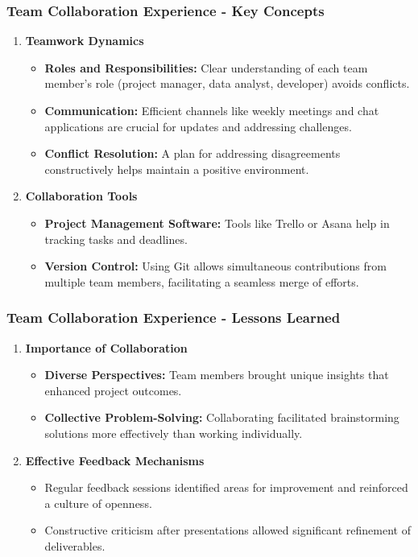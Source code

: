 \documentclass[aspectratio=169]{beamer}
\begin{document}
\begin{frame}[fragile]
    \frametitle{Team Collaboration Experience - Key Concepts}
    \begin{enumerate}
        \item \textbf{Teamwork Dynamics}
            \begin{itemize}
                \item \textbf{Roles and Responsibilities:} Clear understanding of each team member's role (project manager, data analyst, developer) avoids conflicts.
                \item \textbf{Communication:} Efficient channels like weekly meetings and chat applications are crucial for updates and addressing challenges.
                \item \textbf{Conflict Resolution:} A plan for addressing disagreements constructively helps maintain a positive environment.
            \end{itemize}
        
        \item \textbf{Collaboration Tools}
            \begin{itemize}
                \item \textbf{Project Management Software:} Tools like Trello or Asana help in tracking tasks and deadlines.
                \item \textbf{Version Control:} Using Git allows simultaneous contributions from multiple team members, facilitating a seamless merge of efforts.
            \end{itemize}
    \end{enumerate}
\end{frame}

\begin{frame}[fragile]
    \frametitle{Team Collaboration Experience - Lessons Learned}
    \begin{enumerate}
        \item \textbf{Importance of Collaboration}
            \begin{itemize}
                \item \textbf{Diverse Perspectives:} Team members brought unique insights that enhanced project outcomes.
                \item \textbf{Collective Problem-Solving:} Collaborating facilitated brainstorming solutions more effectively than working individually.
            \end{itemize}
        
        \item \textbf{Effective Feedback Mechanisms}
            \begin{itemize}
                \item Regular feedback sessions identified areas for improvement and reinforced a culture of openness.
                \item Constructive criticism after presentations allowed significant refinement of deliverables.
            \end{itemize}
    \end{enumerate}
\end{frame}
\end{document}
